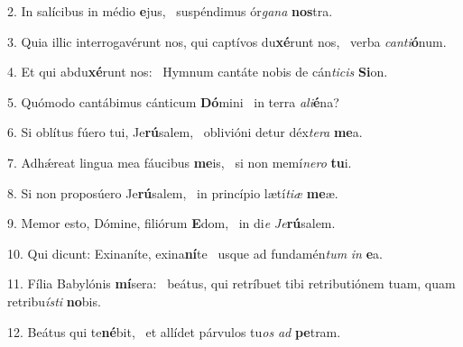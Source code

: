 2. In salícibus in médio \textbf{e}jus, \ast\  suspéndimus ór\textit{ga}\textit{na} \textbf{nos}tra.\

3. Quia illic interrogavérunt nos, qui captívos du\textbf{xé}runt nos, \ast\  verba \textit{can}\textit{ti}\textbf{ó}num.\

4. Et qui abdu\textbf{xé}runt nos: \ast\  Hymnum cantáte nobis de cán\textit{ti}\textit{cis} \textbf{Si}on.\

5. Quómodo cantábimus cánticum \textbf{Dó}mini \ast\  in terra \textit{a}\textit{li}\textbf{é}na?\

6. Si oblítus fúero tui, Je\textbf{rú}salem, \ast\  oblivióni detur déx\textit{te}\textit{ra} \textbf{me}a.\

7. Adhǽreat lingua mea fáucibus \textbf{me}is, \ast\  si non memí\textit{ne}\textit{ro} \textbf{tu}i.\

8. Si non proposúero Je\textbf{rú}salem, \ast\  in princípio lætí\textit{ti}\textit{æ} \textbf{me}æ.\

9. Memor esto, Dómine, filiórum \textbf{E}dom, \ast\  in di\textit{e} \textit{Je}\textbf{rú}salem.\

10. Qui dicunt: Exinaníte, exina\textbf{ní}te \ast\  usque ad fundamén\textit{tum} \textit{in} \textbf{e}a.\

11. Fília Babylónis \textbf{mí}sera: \ast\  beátus, qui retríbuet tibi retributiónem tuam, quam retribu\textit{ís}\textit{ti} \textbf{no}bis.\

12. Beátus qui te\textbf{né}bit, \ast\  et allídet párvulos tu\textit{os} \textit{ad} \textbf{pe}tram.\

